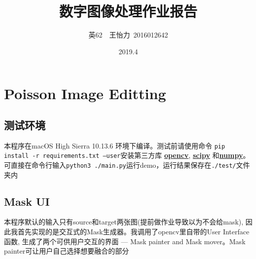 \documentclass[a4paper]{article}
\title{\bf 数字图像处理作业报告}
\date{2019.4}
\author{英62~~王怡力~2016012642}
\begin{document}
\kaishu
\ttfamily
\maketitle
\tableofcontents
\newpage
\section{Poisson Image Editting}
\subsection{测试环境}

本程序在macOS High Sierra 10.13.6 环境下编译。测试前请使用命令 
\texttt{pip install -r requirements.txt --user}安装第三方库 \underline{\textbf{opencv}}, \underline{\textbf{scipy}} 和\underline{\textbf{numpy}}。可直接在命令行输入\texttt{python3 ./main.py}运行demo，运行结果保存在\texttt{./test/}文件夹内

\subsection{Mask UI}


本程序默认的输入只有source和target两张图(提前做作业导致以为不会给mask), 因此我首先实现的是交互式的Mask生成器。我调用了opencv里自带的User Interface函数, 生成了两个可供用户交互的界面 --- Mask painter and Mask mover。Mask painter可让用户自己选择想要融合的部分

\begin{figure}[htpb]
  \centering 
\end{figure}
\end{document}
